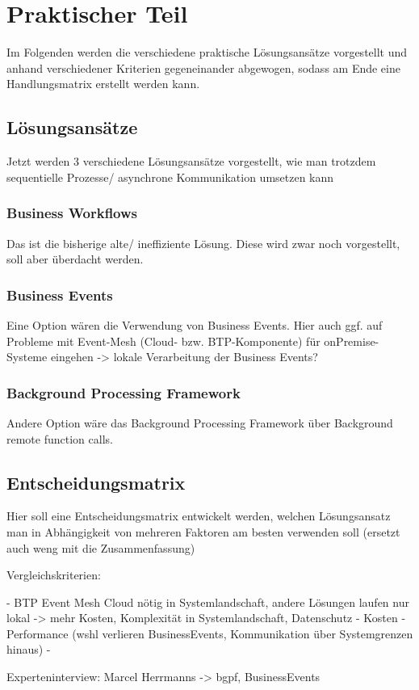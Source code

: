 \chapter{Praktischer Teil}

Im Folgenden werden die verschiedene praktische Lösungsansätze vorgestellt und anhand verschiedener Kriterien gegeneinander abgewogen, sodass am Ende eine Handlungsmatrix erstellt werden kann.

\section{Lösungsansätze}

Jetzt werden 3 verschiedene Lösungsansätze vorgestellt, wie man trotzdem sequentielle Prozesse/ asynchrone Kommunikation umsetzen kann

\subsection{Business Workflows}

Das ist die bisherige alte/ ineffiziente Lösung. Diese wird zwar noch vorgestellt, soll aber überdacht werden.

\subsection{Business Events}

Eine Option wären die Verwendung von Business Events. Hier auch ggf. auf Probleme mit Event-Mesh (Cloud- bzw. BTP-Komponente) für onPremise-Systeme eingehen -> lokale Verarbeitung der Business Events? 

\subsection{Background Processing Framework}

Andere Option wäre das Background Processing Framework über Background remote function calls.

\section{Entscheidungsmatrix}

Hier soll eine Entscheidungsmatrix entwickelt werden, welchen Lösungsansatz man in Abhängigkeit von mehreren Faktoren am besten verwenden soll (ersetzt auch weng mit die Zusammenfassung)

Vergleichskriterien:

- BTP Event Mesh Cloud nötig in Systemlandschaft, andere Lösungen laufen nur lokal -> mehr Kosten,  Komplexität in Systemlandschaft, Datenschutz
- Kosten
- Performance (wshl verlieren BusinessEvents, Kommunikation über Systemgrenzen hinaus)
- 

Experteninterview: Marcel Herrmanns -> bgpf, BusinessEvents